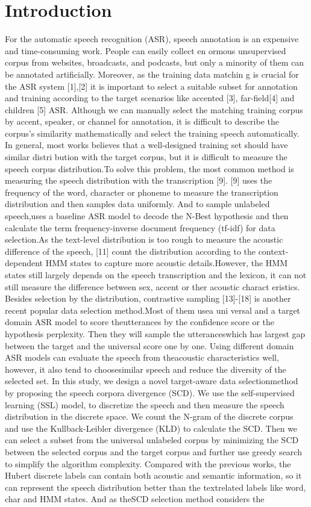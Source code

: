 \section{Introduction}
For the automatic speech recognition (ASR), speech annotation is an expensive and time-consuming work. People can easily collect en
ormous unsupervised corpus from websites, broadcasts, and podcasts, but only a minority of them can be annotated artificially.
Moreover, as the training data matchin
g is crucial for the ASR system [1],[2] it is important to select a suitable subset for annotation and training according to the 
target scenarios like accented [3], far-field[4] and children [5] ASR.
Although we can manually select the matching training corpus by accent, speaker, or channel for annotation, it is difficult to describe the corpus's 
similarity mathematically and select the training speech automatically.  In general, most works believes that a well-designed training set should have
similar distri bution with the target corpus, but it is difficult to measure the speech corpus distribution.To solve this problem, the most common method 
is measuring the speech distribution with the transcription [9]. [9] uses the frequency of the word, character or phoneme to measure the transcription 
distribution and then samples data uniformly. And to sample unlabeled speech,uses a baseline ASR model to decode the N-Best hypothesis and then calculate 
the term frequency-inverse document frequency (tf-idf) for data selection.As the text-level distribution is too rough to measure the acoustic difference 
of the speech, [11] count the distribution according to the context-dependent HMM states to capture more acoustic details.However, the HMM states still 
largely depends on the speech transcription and the lexicon, it can not still measure the difference between sex, accent or ther acoustic charact eristics.
Besides selection by the distribution, contrastive sampling [13]-[18] is another recent popular data selection method.Most of them usea uni versal and a 
target domain ASR model to score theutterances by the confidence score or the hypothesis perplexity.
Then they will sample the utteranceswhich has largest gap between the target and the universal score one by one. Using different domain ASR models can 
evaluate the speech from theacoustic characteristics well, however, it also tend to choosesimilar speech and reduce the diversity of the selected set.
In this study, we design a novel target-aware data selectionmethod by proposing the speech corpora divergence (SCD).
We use the self-supervised learning (SSL) model, to discretize the speech and then measure the speech
distribution in the discrete space. We count the N-gram of the discrete corpus and use the Kullback-Leibler divergence
(KLD) to calculate the SCD. Then we can select a subset from the universal unlabeled corpus by minimizing the SCD
between the selected corpus and the target corpus and further use greedy search to simplify the algorithm complexity.
Compared with the previous works, the Hubert discrete labels can contain both acoustic and semantic information, so it
can represent the speech distribution better than the textrelated labels like word, char and HMM states. And as theSCD selection method considers the 